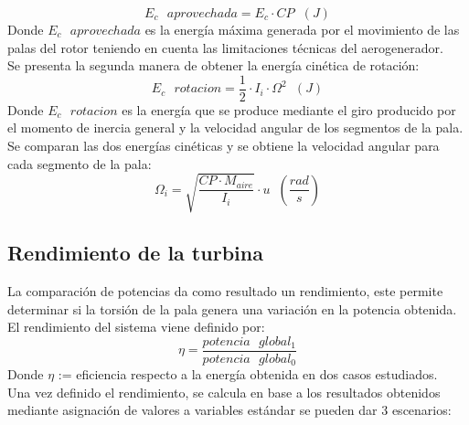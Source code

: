 \begin{equation}
    E_c \text{ } aprovechada = E_c \cdot CP \hspace{7pt} (J)
\end{equation}
Donde $E_c \text{ } aprovechada$ es la energía máxima generada por el movimiento de las palas del rotor teniendo en cuenta las limitaciones técnicas del aerogenerador.\\

Se presenta la segunda manera de obtener la energía cinética de rotación:
\begin{equation}
    E_c  \text{ } rotacion = \dfrac{1}{2} \cdot I_i \cdot \Omega^2  \hspace{7pt} (J)
\end{equation}
Donde $E_c \text{ } rotacion$ es la energía que se produce mediante el giro producido por el momento de inercia general y la velocidad angular de los segmentos de la pala. \\

Se comparan las dos energías cinéticas y se obtiene la velocidad angular para cada segmento de la pala:
\begin{equation}
    \Omega_i = \sqrt{\dfrac{CP \cdot M_{aire}}{I_i}} \cdot u  \hspace{7pt} (\dfrac{rad}{s})
\end{equation}


 \subsection{Rendimiento de la turbina}
 \label{section:rendimiento}
 
La comparación de potencias da como resultado un rendimiento, este permite determinar si la torsión de la pala genera una variación en la potencia obtenida.\\

El rendimiento del sistema viene definido por:
\begin{equation}
  \eta = \dfrac{potencia \text{ } global_1}{potencia \text{ } global_0}  
 \label{def:rendimiento_potencias}
 \end{equation}
  Donde $\eta$ := eficiencia respecto a la energía obtenida en dos casos estudiados.\\
 
 Una vez definido el rendimiento, se calcula en base a los resultados obtenidos mediante asignación de valores a variables estándar se pueden dar 3 escenarios:
 

